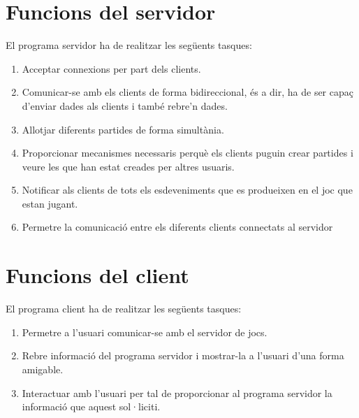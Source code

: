 \section{Funcions del servidor}

El programa servidor ha de realitzar les següents tasques:

\begin{enumerate}
	\item{Acceptar connexions per part dels clients.}
	\item{Comunicar-se amb els clients de forma bidireccional, és a dir, ha de ser capaç d'enviar dades als clients  i també rebre'n dades.}
	\item{Allotjar diferents partides de forma simultània.}
	\item{Proporcionar mecanismes necessaris perquè els clients puguin crear partides i veure les que han estat creades per altres usuaris.}
	\item{Notificar als clients de tots els esdeveniments que es produeixen en el joc que estan jugant.}
	\item{Permetre la comunicació entre els diferents clients connectats al servidor}	
\end{enumerate}

\section{Funcions del client}

El programa client ha de realitzar les següents tasques: 

\begin{enumerate}
	\item{Permetre a l'usuari comunicar-se amb el servidor de jocs.}
	\item{Rebre informació del programa servidor i mostrar-la a l'usuari d'una forma amigable.}
	\item{Interactuar amb l'usuari per tal de proporcionar al programa servidor la informació que aquest sol·liciti.}	
\end{enumerate}


